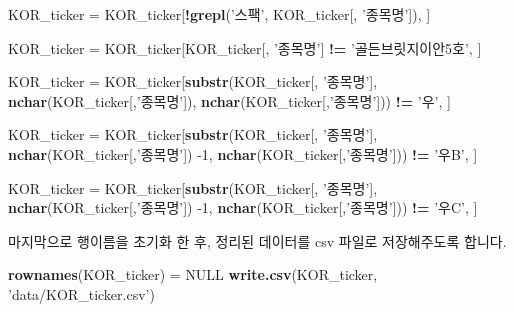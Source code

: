 \documentclass[12pt,]{book}
\newenvironment{Shaded}{\begin{snugshade}}{\end{snugshade}}
\newcommand{\DecValTok}[1]{\textcolor[rgb]{0.00,0.00,0.81}{#1}}
\newcommand{\KeywordTok}[1]{\textcolor[rgb]{0.13,0.29,0.53}{\textbf{#1}}}
\newcommand{\NormalTok}[1]{#1}
\newcommand{\OperatorTok}[1]{\textcolor[rgb]{0.81,0.36,0.00}{\textbf{#1}}}
\newcommand{\OtherTok}[1]{\textcolor[rgb]{0.56,0.35,0.01}{#1}}
\newcommand{\StringTok}[1]{\textcolor[rgb]{0.31,0.60,0.02}{#1}}
\begin{document}
\begin{Shaded}
\begin{Highlighting}[]
\NormalTok{KOR_ticker =}\StringTok{ }\NormalTok{KOR_ticker[}\OperatorTok{!}\KeywordTok{grepl}\NormalTok{(}\StringTok{'스팩'}\NormalTok{, KOR_ticker[, }\StringTok{'종목명'}\NormalTok{]), ]  }

\NormalTok{KOR_ticker =}\StringTok{ }\NormalTok{KOR_ticker[KOR_ticker[, }\StringTok{'종목명'}\NormalTok{] }\OperatorTok{!=}
\StringTok{                          '골든브릿지이안5호'}\NormalTok{, ] }

\NormalTok{KOR_ticker =}\StringTok{ }\NormalTok{KOR_ticker[}\KeywordTok{substr}\NormalTok{(KOR_ticker[, }\StringTok{'종목명'}\NormalTok{],}
                               \KeywordTok{nchar}\NormalTok{(KOR_ticker[,}\StringTok{'종목명'}\NormalTok{]),}
                               \KeywordTok{nchar}\NormalTok{(KOR_ticker[,}\StringTok{'종목명'}\NormalTok{])) }\OperatorTok{!=}
\StringTok{                          '우'}\NormalTok{, ]}

\NormalTok{KOR_ticker =}\StringTok{ }\NormalTok{KOR_ticker[}\KeywordTok{substr}\NormalTok{(KOR_ticker[, }\StringTok{'종목명'}\NormalTok{],}
                               \KeywordTok{nchar}\NormalTok{(KOR_ticker[,}\StringTok{'종목명'}\NormalTok{]) }\DecValTok{-1}\NormalTok{,}
                               \KeywordTok{nchar}\NormalTok{(KOR_ticker[,}\StringTok{'종목명'}\NormalTok{])) }\OperatorTok{!=}
\StringTok{                          '우B'}\NormalTok{, ] }

\NormalTok{KOR_ticker =}\StringTok{ }\NormalTok{KOR_ticker[}\KeywordTok{substr}\NormalTok{(KOR_ticker[, }\StringTok{'종목명'}\NormalTok{],}
                               \KeywordTok{nchar}\NormalTok{(KOR_ticker[,}\StringTok{'종목명'}\NormalTok{]) }\DecValTok{-1}\NormalTok{,}
                               \KeywordTok{nchar}\NormalTok{(KOR_ticker[,}\StringTok{'종목명'}\NormalTok{])) }\OperatorTok{!=}
\StringTok{                          '우C'}\NormalTok{, ] }
\end{Highlighting}
\end{Shaded}

마지막으로 행이름을 초기화 한 후, 정리된 데이터를 csv 파일로 저장해주도록 합니다.

\begin{Shaded}
\begin{Highlighting}[]
\KeywordTok{rownames}\NormalTok{(KOR_ticker) =}\StringTok{ }\OtherTok{NULL}
\KeywordTok{write.csv}\NormalTok{(KOR_ticker, }\StringTok{'data/KOR_ticker.csv'}\NormalTok{)}
\end{Highlighting}
\end{Shaded}
\end{document}
